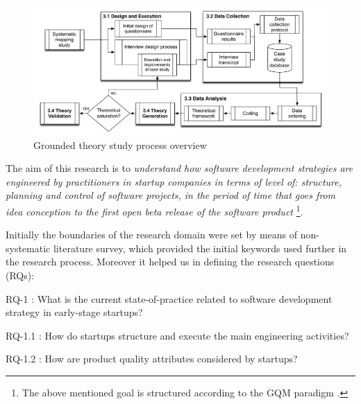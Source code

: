 \documentclass[10pt,journal,letterpaper,compsoc]{IEEEtran}
\begin{document}
\begin{figure}[!t]
\centering
\includegraphics[width=5in]{figures/completemethodology2}
\caption{Grounded theory study process overview}
\label{fig:gt:completemethodology}
\end{figure}

The aim of this research is to \textit{understand how software development 
strategies are engineered by practitioners in startup companies in terms of 
level of: structure, planning and control of software projects, in the period of 
time  that goes from idea conception to the first open beta release of the 
software product} \footnote{The above mentioned goal is structured according to 
the GQM paradigm \cite{Basili1992}.}.

Initially the boundaries of the research domain were set by means of 
non-systematic literature survey, which provided the initial keywords used 
further in the research process. Moreover it helped us in defining the research 
questions (RQs):


\begin{compactitem}

\item RQ-1 : What is the current state-of-practice related to software 
development strategy in early-stage startups?
\begin{compactitem}

\item RQ-1.1 : How do startups structure and execute the main engineering 
activities?
\item RQ-1.2 : How are product quality attributes considered by startups?
\end{compactitem}

\end{compactitem}
\end{document}
